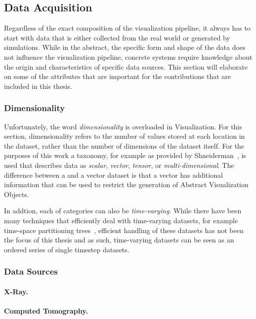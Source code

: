 \subsection{Data Acquisition} \label{cha:intro:vp:da}
Regardless of the exact composition of the visualization pipeline, it always has to start with data that is either collected from the real world or generated by simulations.  While in the abstract, the specific form and shape of the data does not influence the visualization pipeline, concrete systems require knowledge about the origin and characteristics of specific data sources.  This section will elaborate on some of the attributes that are important for the contributions that are included in this thesis.

\subsubsection{Dimensionality} \label{cha:intro:vp:da:dimensionality}
Unfortunately, the word \emph{dimensionality} is overloaded in Visualization.  For this section, dimensionality refers to the number of values stored at each location in the dataset, rather than the number of dimensions of the dataset itself.  For the purposes of this work a taxonomy, for example as provided by Shneiderman~\cite{shneiderman1996eyes}, is used that describes data as \emph{scalar}, \emph{vector}, \emph{tensor}, or \emph{multi-dimensional}.  The difference between a  and a vector dataset is that a vector has additional information that can be used to restrict the generation of Abstract Visualization Objects.

In addtion, each of categories can also be \emph{time-varying}.  While there have been many techniques that efficiently deal with time-varying datasets, for example time-space partitioning trees~\cite{shen1999fast}, efficient handling of these datasets has not been the focus of this thesis and as such, time-varying datasets can be seen as an ordered series of single timestep datasets.

\subsubsection{Data Sources} \label{cha:intro:vp:da:sources}



\paragraph{X-Ray. }
\paragraph{Computed Tomography. }

